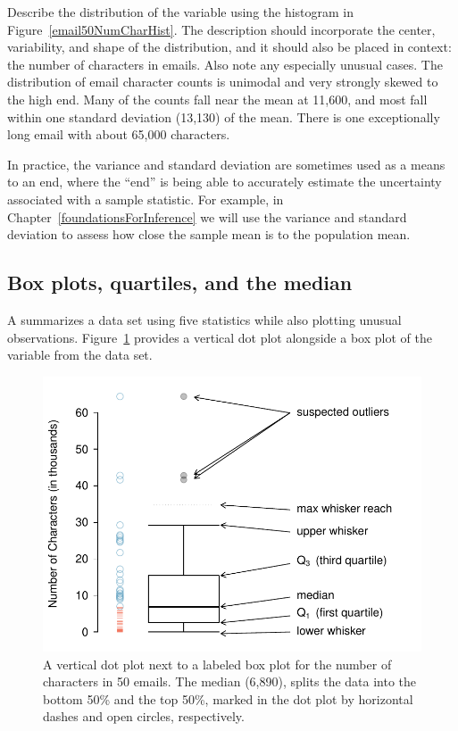 \begin{example}{Describe the distribution of the  variable using the histogram in Figure~\vref{email50NumCharHist}. The description should incorporate the center, variability, and shape of the distribution, and it should also be placed in context: the number of characters in emails. Also note any especially unusual cases.}
The distribution of email character counts is unimodal and very strongly skewed to the high end. Many of the counts fall near the mean at 11,600, and most fall within one standard deviation (13,130) of the mean. There is one exceptionally long email with about 65,000 characters.
\end{example}

In practice, the variance and standard deviation are sometimes used as a means to an end, where the ``end'' is being able to accurately estimate the uncertainty associated with a sample statistic. For example, in Chapter~\ref{foundationsForInference} we will use the variance and standard deviation to assess how close the sample mean is to the population mean.

\subsection{Box plots, quartiles, and the median}

A  summarizes a data set using five statistics while also plotting unusual observations. Figure~\ref{boxPlotLayoutNumVar} provides a vertical dot plot alongside a box plot of the  variable from the  data set.

\begin{figure}[h]
   \centering
   \includegraphics[width=0.86\mycaptionwidth]{ch_intro_to_data/figures/boxPlotLayoutNumVar/boxPlotLayoutNumVar}
   \caption{A vertical dot plot next to a labeled box plot for the number of characters in 50 emails. The median (6,890), splits the data into the bottom 50\% and the top 50\%, marked in the dot plot by horizontal dashes and open circles, respectively.}
   \label{boxPlotLayoutNumVar}
\end{figure}

